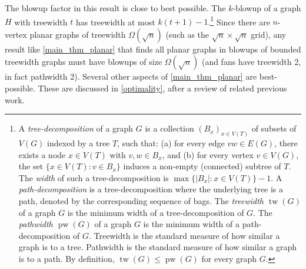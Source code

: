 \documentclass{patmorin}
\renewcommand{\leq}{\leqslant}
\newcommand{\defin}[1]{\emph{\textcolor{brightmaroon}{#1}}}
\DeclareMathOperator{\tw}{tw}
\DeclareMathOperator{\pw}{pw}
\begin{document}
The blowup factor in this result is close to best possible. The $k$-blowup of a graph $H$ with treewidth $t$ has treewidth at most $k(t+1)-1$.\footnote{A \defin{tree-decomposition} of a graph $G$ is a collection $(B_x)_{x \in V(T)}$ of subsets of $V(G)$ indexed by a tree $T$, such that: (a) for every edge ${vw \in E(G)}$, there exists a node ${x \in V(T)}$ with ${v,w \in B_x}$, and (b) for every vertex ${v \in V(G)}$, the set $\{ x \in V(T) \colon v \in B_x \}$ induces a non-empty (connected) subtree of $T$. The \defin{width} of such a tree-decomposition is ${\max\{ |B_x| \colon x \in V(T) \}-1}$. A \defin{path-decomposition} is a tree-decomposition where the underlying tree is a path, denoted by the corresponding sequence of bags. The \defin{treewidth $\tw(G)$} of a graph $G$ is the minimum width of a tree-decomposition of $G$. The \defin{pathwidth $\pw(G)$} of a graph $G$ is the minimum width of a path-decomposition of $G$. Treewidth is the standard measure of how similar a graph is to a tree. Pathwidth is the standard measure of how similar a graph is to a path. By definition, $\tw(G)\leq\pw(G)$ for every graph $G$.}  Since there are $n$-vertex planar graphs of treewidth $\Omega(\sqrt{n})$ (such as the $\sqrt{n}\times\sqrt{n}$ grid), any result like \cref{main_thm_planar} that finds all planar graphs in blowups of bounded treewidth graphs must have blowups of size $\Omega(\sqrt{n})$
(and fans have treewidth 2, in fact pathwidth 2).  Several other aspects of \cref{main_thm_planar} are best-possible. These are discussed in \cref{optimality}, after a review of related previous work.




\end{document}

